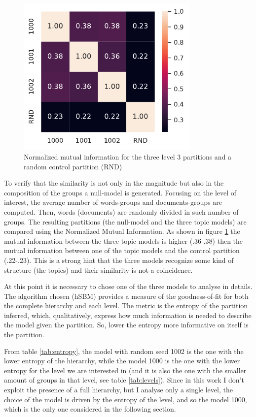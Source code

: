 \documentclass[a4paper, 11pt, headings=standardclasses, tablecaptionsbelow]{scrartcl}
\begin{document}
\begin{figure}[tb]
  \centering
  \includegraphics[width=3.5in]{src/mi.pdf}
  \caption[Mutual Information for the level of interest]{Normalized mutual information for the three level 3 partitions and a random control partition (RND)}
  \label{fig:mi}
\end{figure}

To verify that the similarity is not only in the magnitude but also in the composition of the groups a null-model is generated. Focusing on the level of interest, the average number of words-groups and documents-groups are computed. Then, words (documents) are randomly divided in such number of groups. The resulting partitions (the null-model and the three topic models) are compared using the Normalized Mutual Information. As shown in figure \ref{fig:mi} the mutual information between the three topic models is higher (.36-.38) then the mutual information between one of the topic models and the control partition (.22-.23). This is a strong hint that the three models recognize some kind of structure (the topics) and their similarity is not a coincidence.



At this point it is necessary to chose one of the three models to analyse in details. The algorithm chosen (hSBM) provides a measure of the goodness-of-fit for both the complete hierarchy and each level. The metric is the entropy of the partition inferred, which, qualitatively, express how much information is needed to describe the model given the partition. So, lower the entropy more informative on itself is the partition.

From table \ref{tab:entropy}, the model with random seed 1002 is the one with the lower entropy of the hierarchy, while the model 1000 is the one with the lower entropy for the level we are interested in (and it is also the one with the smaller amount of groups in that level, see table \ref{tab:levels}). Since in this work I don't exploit the presence of a full hierarchy, but I analyse only a single level, the choice of the model is driven by the entropy of the level, and so the model 1000, which is the only one considered in the following section.
\end{document}
